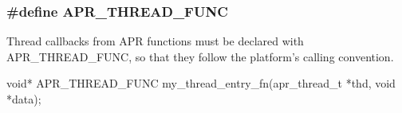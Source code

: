 \begin{DoxyPre}\end{DoxyPre}
 \hypertarget{group__apr__platform_gade8f829f9bd98fd4386894acf72edd7c}{
\subsubsection[{A\-P\-R\-\_\-\-T\-H\-R\-E\-A\-D\-\_\-\-F\-U\-N\-C}]{\setlength{\rightskip}{0pt plus 5cm}\#define A\-P\-R\-\_\-\-T\-H\-R\-E\-A\-D\-\_\-\-F\-U\-N\-C}}\label{group__apr__platform_gade8f829f9bd98fd4386894acf72edd7c}
Thread callbacks from A\-P\-R functions must be declared with A\-P\-R\-\_\-\-T\-H\-R\-E\-A\-D\-\_\-\-F\-U\-N\-C, so that they follow the platform's calling convention. 
\begin{DoxyPre}\end{DoxyPre}



\begin{DoxyPre}void* APR\_THREAD\_FUNC my\_thread\_entry\_fn(apr\_thread\_t *thd, void *data);\end{DoxyPre}



\begin{DoxyPre}\end{DoxyPre}
 